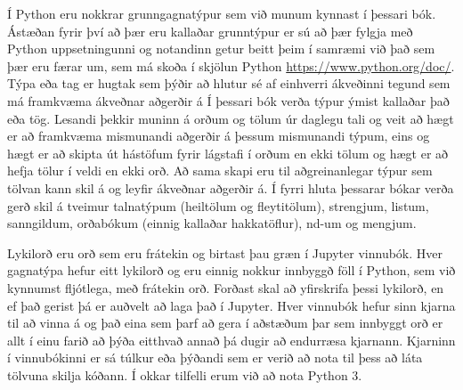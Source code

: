 Í Python eru nokkrar grunngagnatýpur sem við munum kynnast í þessari bók. 
Ástæðan fyrir því að þær eru kallaðar grunntýpur er sú að þær fylgja með Python uppsetningunni og notandinn getur beitt þeim í samræmi við það sem þær eru færar um, sem má skoða í skjölun Python \href{https://www.python.org/doc/}{https://www.python.org/doc/}. 
Týpa eða tag er hugtak sem þýðir að hlutur sé af einhverri ákveðinni tegund sem má framkvæma ákveðnar aðgerðir á
Í þessari bók verða týpur ýmist kallaðar það eða tög. 
Lesandi þekkir muninn á orðum og tölum úr daglegu tali og veit að hægt er að framkvæma mismunandi aðgerðir á þessum mismunandi týpum, eins og hægt er að skipta út hástöfum fyrir lágstafi í orðum en ekki tölum og hægt er að hefja tölur í veldi en ekki orð. 
Að sama skapi eru til aðgreinanlegar týpur sem tölvan kann skil á og leyfir ákveðnar aðgerðir á.
Í fyrri hluta þessarar bókar verða gerð skil á tveimur talnatýpum (heiltölum og fleytitölum), strengjum, listum, sanngildum, orðabókum (einnig kallaðar hakkatöflur), nd-um og mengjum.

Lykilorð eru orð sem eru frátekin og birtast þau græn í Jupyter vinnubók. 
Hver gagnatýpa hefur eitt lykilorð og eru einnig nokkur innbyggð föll í Python, sem við kynnumst fljótlega, með frátekin orð. 
Forðast skal að yfirskrifa þessi lykilorð, en ef það gerist þá er auðvelt að laga það í Jupyter. 
Hver vinnubók hefur sinn kjarna til að vinna á og það eina sem þarf að gera í aðstæðum þar sem innbyggt orð er allt í einu farið að þýða eitthvað annað þá dugir að endurræsa kjarnann.
Kjarninn í vinnubókinni er sá túlkur eða þýðandi sem er verið að nota til þess að láta tölvuna skilja kóðann.
Í okkar tilfelli erum við að nota Python 3.